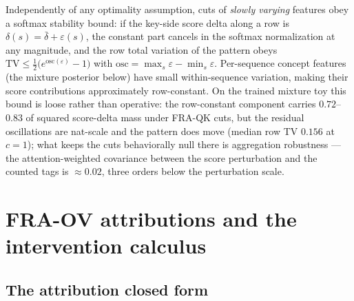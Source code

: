\documentclass{article}
\theoremstyle{definition}
\begin{document}
Independently of any optimality assumption, cuts of \emph{slowly varying}
features obey a softmax stability bound: if the key-side score delta along a
row is $\delta(s) = \bar\delta + \varepsilon(s)$, the constant part cancels
in the softmax normalization at any magnitude, and the row total variation
of the pattern obeys $\mathrm{TV} \le \tfrac12\bigl(e^{\mathrm{osc}(\varepsilon)}
- 1\bigr)$ with $\mathrm{osc} = \max_s \varepsilon - \min_s \varepsilon$.
Per-sequence concept features (the mixture posterior below) have small
within-sequence variation, making their score contributions approximately
row-constant. On the trained mixture toy this bound is loose rather than
operative: the row-constant component carries $0.72$--$0.83$ of squared
score-delta mass under FRA-QK cuts, but the residual oscillations are
nat-scale and the pattern does move (median row TV $0.156$ at $c=1$); what
keeps the cuts behaviorally null there is aggregation robustness --- the
attention-weighted covariance between the score perturbation and the counted
tags is $\approx 0.02$, three orders below the perturbation scale.

\section{FRA-OV attributions and the intervention calculus}

\subsection{The attribution closed form}
\end{document}
